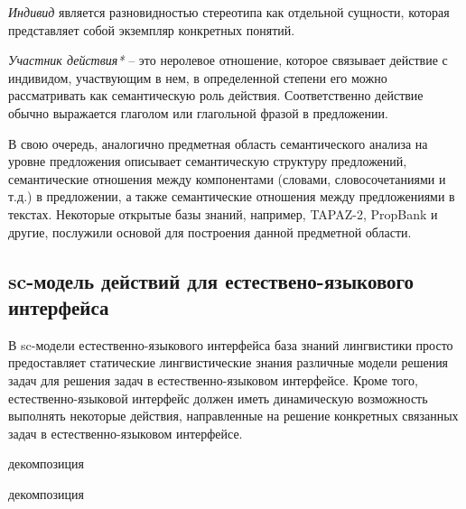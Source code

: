 \textit{Индивид} является разновидностью стереотипа как отдельной сущности, которая представляет собой  экземпляр конкретных понятий. 

\textit{Участник действия*} -- это неролевое отношение, которое связывает действие с индивидом, участвующим в нем, в определенной степени его можно рассматривать как семантическую роль действия. Соответственно действие обычно выражается глаголом или глагольной фразой в предложении.

В свою очередь, аналогично предметная область семантического анализа на уровне предложения описывает семантическую структуру предложений, семантические отношения между компонентами (словами, словосочетаниями и т.д.) в предложении, а также семантические отношения между предложениями в текстах. Некоторые открытые базы знаний, например, TAPAZ-2, PropBank и другие, послужили основой для построения данной предметной области.

\subsection{sc-модель действий для естествено-языкового интерфейса}
В sc-модели естественно-языкового интерфейса база знаний лингвистики просто предоставляет статические лингвистические знания различные модели решения задач для решения задач в естественно-языковом интерфейсе. Кроме того, естественно-языковой интерфейс должен иметь динамическую возможность выполнять некоторые действия, направленные на решение конкретных связанных задач в естественно-языковом интерфейсе. 
\begin{SCn}
	\begin{scnrelfromset}{декомпозиция}
	\end{scnrelfromset}
\end{SCn}

\begin{SCn}
	\begin{scnrelfromset}{декомпозиция}
	\end{scnrelfromset}
\end{SCn}

